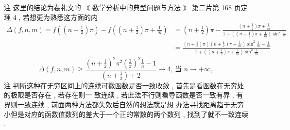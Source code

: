 \documentclass[10pt]{article}
\begin{document}
{ 注   这里的结论为裴礼文的 《 数学分析中的典型问题与方法 》 第二片第  168  页定理  4 ,  若想更为熟悉这方面的内 
$$
\begin{aligned}
\Delta(f, n, m)=f\left(\left(n+\frac{1}{2}\right) \pi\right)-f\left(\left(n+\frac{1}{2}\right) \pi+\frac{1}{m}\right) &=\left(n+\frac{1}{2}\right) \pi-\frac{\left(n+\frac{1}{2}\right) \pi+\frac{1}{m}}{1+\left(\left(n+\frac{1}{2}\right) \pi+\frac{1}{m}\right) \sin ^{2} \frac{1}{m}} \\
&=\frac{\left(n+\frac{1}{2}\right) \pi\left(\left(n+\frac{1}{2}\right) \pi+\frac{1}{m}\right) \sin ^{2} \frac{1}{m}-\frac{1}{m}}{1+\left(\left(n+\frac{1}{2}\right) \pi+\frac{1}{m}\right) \sin ^{2} \frac{1}{m}}
\end{aligned}
$$
$$
\Delta(f, n, m) \geqslant \frac{\left(n+\frac{1}{2}\right)^{2} \pi^{2}\left(\frac{2}{\pi}\right)^{2} \frac{1}{n}-1}{\left(n+\frac{1}{2}\right)+2} \rightarrow 4 \text {, 当 } n \rightarrow+\infty,
$$
 注   判断这种在无穷区间上的连续可微函数是否一致收敛 ,  首先是看函数在无穷处的极限是否存在 ,  若存在则一   致连续 ,  若此法不行则看导函数是否一致有界 ,  有界则一致连续 ,  前面两种方法都失效后自然的想法就是想   办法寻找距离趋于无穷小但是对应的函数值数列的差大于一个正的常数的两个数列 ,  找到了就不一致连续 .

}
\end{document}
